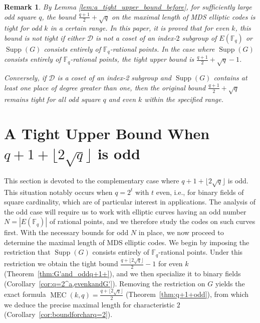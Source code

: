 \documentclass[journal,12pt,onecolumn]{IEEEtran}
\newtheorem{remark}[theorem]{Remark}
\begin{document}
\begin{remark}
    By Lemma \ref{lem:a_tight_upper_bound_before}, for sufficiently large odd square $q$, the bound $\frac{q+1}{2}+\sqrt{q}$ on the maximal length of MDS elliptic codes is tight for odd $k$ in a certain range. In this paper, it is proved that for even $k$, this bound is not tight if either $\mathcal{D}$ is not a coset of an index‑$2$ subgroup of $E(\mathbb{F}_q)$ or $\operatorname{Supp}(G)$ consists entirely of $\mathbb{F}_q$-rational points. In the case where $\operatorname{Supp}(G)$ consists entirely of $\mathbb{F}_q$-rational points, the tight upper bound is $\frac{q+1}{2}+\sqrt{q} - 1$.

   Conversely, if $\mathcal{D}$ is a coset of an index-2 subgroup and $\operatorname{Supp}(G)$ contains at least one place of degree greater than one, then the original bound $\frac{q+1}{2}+\sqrt{q}$ remains tight for all odd square $q$ and even $k$ within the specified range.

\end{remark}


\section{A Tight Upper Bound When $q+1+\lfloor 2\sqrt{q}\rfloor$ is odd}\label{sec:A_tight_upper_bound_for_the_case_of_characteristic_2}
This section is devoted to the complementary case where $q+1+\lfloor 2\sqrt{q}\rfloor$ is odd. This situation notably occurs when $q = 2^t$ with $t$ even, i.e., for binary fields of square cardinality, which are of particular interest in applications.
The analysis of the odd case will require us to work with elliptic curves having an odd number $N = |E(\mathbb{F}_q)|$ of rational points, and we therefore study the codes on such curves first.
With the necessary bounds for odd $N$ in place, we now proceed to determine the maximal length of MDS elliptic codes. We begin by imposing the restriction that $\operatorname{Supp}(G)$ consists entirely of $\mathbb{F}_q$-rational points. Under this restriction we obtain the tight bound $\frac{q+\lfloor 2\sqrt{q}\rfloor}{2}-1$ for even $k$ (Theorem~\ref{thm:G'and_oddq+1+}), and we then specialize it to binary fields (Corollary~\ref{cor:q=2^a,evenkandG'}). Removing the restriction on $G$ yields the exact formula $\operatorname{MEC}(k,q)=\frac{q+\lfloor 2\sqrt{q}\rfloor}{2}$ (Theorem~\ref{thm:q+1+odd}), from which we deduce the precise maximal length for characteristic $2$ (Corollary~\ref{cor:boundforcharq=2}).
\end{document}
